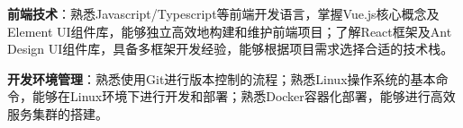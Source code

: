 \item \textbf{前端技术}：熟悉Javascript/Typescript等前端开发语言，掌握Vue.js核心概念及Element UI组件库，能够独立高效地构建和维护前端项目；了解React框架及Ant Design UI组件库，具备多框架开发经验，能够根据项目需求选择合适的技术栈。
\item \textbf{开发环境管理}：熟悉使用Git进行版本控制的流程；熟悉Linux操作系统的基本命令，能够在Linux环境下进行开发和部署；熟悉Docker容器化部署，能够进行高效服务集群的搭建。